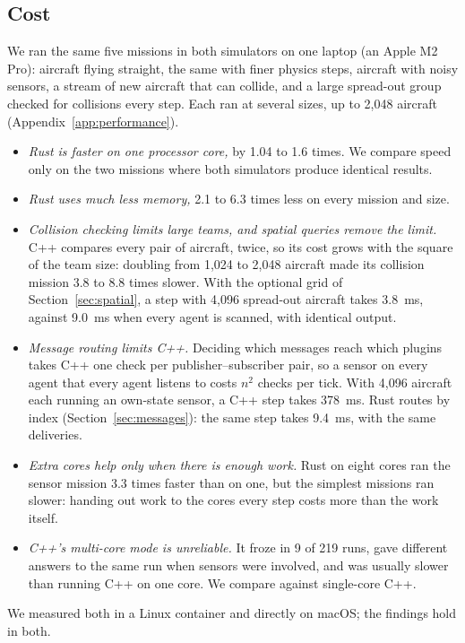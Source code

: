 \documentclass[conference]{IEEEtran}
\begin{document}
\subsection{Cost}
\label{sec:performance}

We ran the same five missions in both simulators on one laptop (an Apple M2
Pro): aircraft flying straight, the same with finer physics steps, aircraft
with noisy sensors, a stream of new aircraft that can collide, and a large
spread-out group checked for collisions every step. Each ran at several sizes,
up to 2{,}048 aircraft (Appendix~\ref{app:performance}).
\begin{itemize}
\item \emph{Rust is faster on one processor core,} by 1.04 to 1.6 times. We
compare speed only on the two missions where both simulators produce identical
results.
\item \emph{Rust uses much less memory,} 2.1 to 6.3 times less on every mission
and size.
\item \emph{Collision checking limits large teams, and spatial queries
remove the limit.} C++ compares every pair of aircraft, twice, so its cost
grows with the square of the team size: doubling from 1{,}024 to 2{,}048
aircraft made its collision mission 3.8 to 8.8 times slower. With
the optional grid of Section~\ref{sec:spatial}, a step with 4{,}096 spread-out
aircraft takes 3.8~ms, against 9.0~ms when every agent is scanned,
with identical output.
\item \emph{Message routing limits C++.} Deciding which messages reach which
plugins takes C++ one check per publisher--subscriber pair, so a sensor on
every agent that every agent listens to costs $n^2$ checks per tick. With
4{,}096 aircraft each running an own-state sensor, a C++ step takes
378~ms. Rust routes by index (Section~\ref{sec:messages}): the same step
takes 9.4~ms, with the same deliveries.
\item \emph{Extra cores help only when there is enough work.} Rust on eight
cores ran the sensor mission 3.3 times faster than on one, but the simplest
missions ran slower: handing out work to the cores every step costs more than
the work itself.
\item \emph{C++'s multi-core mode is unreliable.} It froze in 9 of 219 runs,
gave different answers to the same run when sensors were involved, and was
usually slower than running C++ on one core. We compare against single-core
C++.
\end{itemize}
We measured both in a Linux container and directly on macOS; the findings hold
in both.
\end{document}
